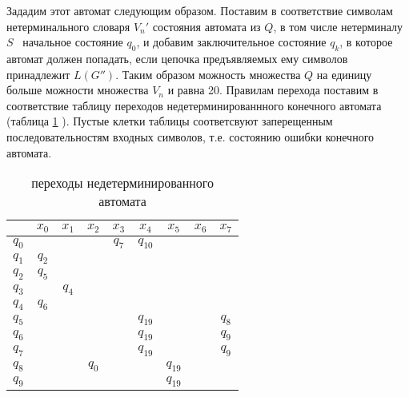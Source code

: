 \documentclass[a4paper,14pt,russian]{extarticle} %
\begin{document}
Зададим этот автомат следующим образом. Поставим в соответствие символам нетерминального словаря \(V_n'\) состояния автомата из \(Q\), в том числе нетерминалу \(S\) \textendash\ начальное состояние \(q_0\), и добавим заключительное состояние \(q_k\), в которое автомат должен попадать, если цепочка предъявляемых ему символов принадлежит \(L(G'')\). Таким образом можность множества \(Q\) на единицу больше можности множества \(V_n\) и равна 20.
Правилам перехода поставим в  соответствие таблицу переходов недетерминированнного конечного автомата (таблица \ref{tab:state_machine} ). Пустые клетки таблицы соответсвуют заперещенным последовательностям входных символов, т.е. состоянию ошибки конечного автомата.  

\begin{table}[H]
	\centering
	\begin{threeparttable}	
	\caption{переходы недетерминированного автомата}	
	\renewcommand{\arraystretch}{0.6}
	\renewcommand{\tabcolsep}{0.9em}	
	\label{tab:state_machine} 
		\begin{tabular}{| l | c |c |c |c |c |c |c |c |}
			\hline
			& \({x_{0}}\) & \({x_{1}}\) & \({x_{2}}\) & \({x_{3}}\) & \({x_{4}}\) & \({x_{5}}\) & \({x_{6}}\) & \({x_{7}}\) \\ \hline
			\({q_{0}}\) & \(\) & \(\) & \(\) & \({q_{7}}\) & \({q_{10}}\) & \(\) & \(\) & \(\) \\ \hline
			\({q_{1}}\) & \({q_{2}}\) & \(\) & \(\) & \(\) & \(\) & \(\) & \(\) & \(\) \\ \hline
			\({q_{2}}\) & \({q_{5}}\) & \(\) & \(\) & \(\) & \(\) & \(\) & \(\) & \(\) \\ \hline
			\({q_{3}}\) & \(\) & \({q_{4}}\) & \(\) & \(\) & \(\) & \(\) & \(\) & \(\) \\ \hline
			\({q_{4}}\) & \({q_{6}}\) & \(\) & \(\) & \(\) & \(\) & \(\) & \(\) & \(\) \\ \hline
			\({q_{5}}\) & \(\) & \(\) & \(\) & \(\) & \({q_{19}}\) & \(\) & \(\) & \({q_{8}}\) \\ \hline
			\({q_{6}}\) & \(\) & \(\) & \(\) & \(\) & \({q_{19}}\) & \(\) & \(\) & \({q_{9}}\) \\ \hline
			\({q_{7}}\) & \(\) & \(\) & \(\) & \(\) & \({q_{19}}\) & \(\) & \(\) & \({q_{9}}\) \\ \hline
			\({q_{8}}\) & \(\) & \(\) & \({q_{0}}\) & \(\) & \(\) & \({q_{19}}\) & \(\) & \(\) \\ \hline
			\({q_{9}}\) & \(\) & \(\) & \(\) & \(\) & \(\) & \({q_{19}}\) & \(\) & \(\) \\ \hline

\end{tabular}
\end{threeparttable}
\end{table}
\end{document}
